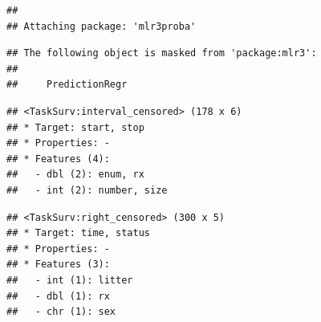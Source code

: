 \documentclass[]{scrbook}
\newenvironment{Shaded}{\begin{snugshade}}{\end{snugshade}}
\newcommand{\CommentTok}[1]{\textcolor[rgb]{0.56,0.35,0.01}{\textit{#1}}}
\newcommand{\DataTypeTok}[1]{\textcolor[rgb]{0.13,0.29,0.53}{#1}}
\newcommand{\DecValTok}[1]{\textcolor[rgb]{0.00,0.00,0.81}{#1}}
\newcommand{\KeywordTok}[1]{\textcolor[rgb]{0.13,0.29,0.53}{\textbf{#1}}}
\newcommand{\NormalTok}[1]{#1}
\newcommand{\OperatorTok}[1]{\textcolor[rgb]{0.81,0.36,0.00}{\textbf{#1}}}
\newcommand{\StringTok}[1]{\textcolor[rgb]{0.31,0.60,0.02}{#1}}
\renewenvironment{Shaded} {\begin{snugshade}\small} {\end{snugshade}}
\begin{document}
\begin{verbatim}
## 
## Attaching package: 'mlr3proba'
\end{verbatim}

\begin{verbatim}
## The following object is masked from 'package:mlr3':
## 
##     PredictionRegr
\end{verbatim}

\begin{Shaded}
\end{Shaded}

\begin{verbatim}
## <TaskSurv:interval_censored> (178 x 6)
## * Target: start, stop
## * Properties: -
## * Features (4):
##   - dbl (2): enum, rx
##   - int (2): number, size
\end{verbatim}

\begin{Shaded}
\end{Shaded}

\begin{verbatim}
## <TaskSurv:right_censored> (300 x 5)
## * Target: time, status
## * Properties: -
## * Features (3):
##   - int (1): litter
##   - dbl (1): rx
##   - chr (1): sex
\end{verbatim}
\end{document}
